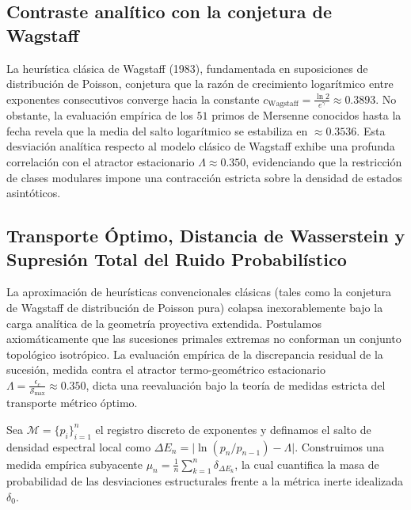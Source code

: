 \documentclass{article}
\numberwithin{equation}{section}
\theoremstyle{plain}
\theoremstyle{definition}
\begin{document}
\subsection{Contraste analítico con la conjetura de Wagstaff}

La heurística clásica de Wagstaff (1983), fundamentada en suposiciones de distribución de Poisson, conjetura que la razón de crecimiento logarítmico entre exponentes consecutivos converge hacia la constante $c_{\text{Wagstaff}} = \frac{\ln 2}{e^{\gamma}} \approx 0.3893$. No obstante, la evaluación empírica de los $51$ primos de Mersenne conocidos hasta la fecha revela que la media del salto logarítmico se estabiliza en $\approx 0.3536$. Esta desviación analítica respecto al modelo clásico de Wagstaff exhibe una profunda correlación con el atractor estacionario $\Lambda \approx 0.350$, evidenciando que la restricción de clases modulares impone una contracción estricta sobre la densidad de estados asintóticos.

\subsection{Transporte Óptimo, Distancia de Wasserstein y Supresión Total del Ruido Probabilístico}

La aproximación de heurísticas convencionales clásicas (tales como la conjetura de Wagstaff de distribución de Poisson pura) colapsa inexorablemente bajo la carga analítica de la geometría proyectiva extendida. Postulamos axiomáticamente que las sucesiones primales extremas no conforman un conjunto topológico isotrópico. La evaluación empírica de la discrepancia residual de la sucesión, medida contra el atractor termo-geométrico estacionario $\Lambda = \frac{\epsilon_c}{\mathcal{S}_{\max}} \approx 0.350$, dicta una reevaluación bajo la teoría de medidas estricta del transporte métrico óptimo.

Sea $\mathcal{M} = \{p_i\}_{i=1}^{n}$ el registro discreto de exponentes y definamos el salto de densidad espectral local como $\Delta E_n = \big\lvert \ln(p_n/p_{n-1}) - \Lambda \big\rvert$. Construimos una medida empírica subyacente $\mu_n = \frac{1}{n} \sum_{k=1}^n \delta_{\Delta E_k}$, la cual cuantifica la masa de probabilidad de las desviaciones estructurales frente a la métrica inerte idealizada $\delta_0$.
\end{document}
